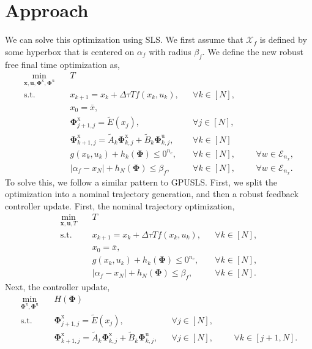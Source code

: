 \documentclass{article}
\begin{document}
\section{Approach}
We can solve this optimization using SLS. We first assume that $\mathcal{X}_f$ is defined by some hyperbox that is centered on $\alpha_f$ with radius $\beta_f$. We define the new robust free final time optimization as,
\begin{subequations}
    \begin{align}
        \min_{\mathbf{x}, \mathbf{u}, \mathbf{\Phi}^\text{x}, \mathbf{\Phi}^\text{u}} \quad & T \\
        \text{s.t.} \quad & x_{k+1} = x_k + \Delta \tau T f(x_k, u_k), && \forall k \in [N], \\
        & x_0 = \bar{x}, \\
        & \mathbf{\Phi}^\text{x}_{j+1, j} = \tilde E(x_j), && \forall j \in [N], \\
        & \mathbf{\Phi}^\text{x}_{k+1, j} = \tilde A_k \mathbf{\Phi}^\text{x}_{k,j} + \tilde B_k \mathbf{\Phi}^\text{u}_{k,j}, && \forall k \in [N]\\
        & g(x_k, u_k) + h_k(\mathbf{\Phi}) \leq 0^{n_c}, && \forall k \in [N], &&& \forall w \in \mathcal{E}_{n_x}, \\
        &  | \alpha_f - x_N | + h_N(\mathbf{\Phi}) \leq \beta_f, && \forall k \in [N], &&& \forall w \in \mathcal{E}_{n_x}.
    \end{align}
\end{subequations}
To solve this, we follow a similar pattern to GPUSLS. First, we split the optimization into a nominal trajectory generation, and then a robust feedback controller update. First, the nominal trajectory optimization,
\begin{subequations}
    \begin{align}
        \min_{\mathbf{x}, \mathbf{u}, T} \quad &  T \\
        \text{s.t.} \quad & x_{k+1} = x_k + \Delta \tau T f(x_k, u_k), && \forall k \in [N], \\
        & x_0 = \bar{x}, \\
        & g(x_k, u_k) + h_k(\mathbf{\Phi}) \leq 0^{n_c}, && \forall k \in [N], \\
        &  | \alpha_f - x_N | + h_N(\mathbf{\Phi}) \leq \beta_f, && \forall k \in [N]. \label{eq:terminal_set_constraints}
    \end{align}
\end{subequations}
Next, the controller update, 
\begin{subequations}
    \begin{align}
        \min_{\mathbf{\Phi}^\text{x}, \mathbf{\Phi}^\text{u}} \quad & H(\mathbf{\Phi}) \\
        \text{s.t.} \quad
        & \mathbf{\Phi}^\text{x}_{j+1, j} = \tilde E(x_j), &&\forall j \in [N], \\
        & \mathbf{\Phi}^\text{x}_{k+1, j} = \tilde A_k \mathbf{\Phi}^\text{x}_{k,j} + \tilde B_k \mathbf{\Phi}^\text{u}_{k,j}, && \forall j \in [N], &&& \forall k \in [j + 1, N].
    \end{align}
\end{subequations}
\end{document}
